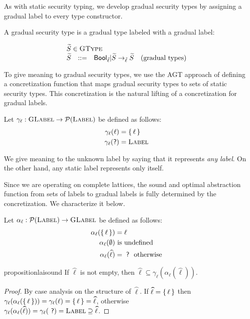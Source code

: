\documentclass[authoryear,sort&compress,9pt,twocolumn,nocopyrightspace]{sigplanconf}
\newcommand{\Bool}{\mathsf{Bool}}
\newcommand{\oblset}[1]{\textsc{#1}}
\newcommand{\Label}{\oblset{Label}}
\newcommand{\GType}{\oblset{GType}}
\newcommand{\GLabel}{\oblset{GLabel}}
\newcommand{\?}{\textsf{\upshape ?}} \newcommand{\consistent}[1]{\widetilde{#1}}
\newcommand{\collecting}[1]{\wideparen{#1}}
\newcommand{\lx}{\ell} \newcommand{\ul}{\?}\newcommand{\clx}{{\tilde{\lx}}} \newcommand{\cll}{\collecting{\lx}} \newcommand{\cS}{{\consistent{S}}} \newcommand{\clS}{\collecting{S}}\newcommand{\subl}{\preccurlyeq}\newcommand{\csubl}{\;\consistent{\subl}\;}
\newcommand{\gammal}{\gamma_\lx}
\newcommand{\alphal}{\alpha_\lx}
\begin{document}
As with static security typing, we develop gradual security types by assigning
a gradual label to every type constructor.

\begin{definition}
A gradual security type is a gradual type labeled with a gradual label:
\end{definition}
\begin{displaymath}
\begin{array}{rcll}
\multicolumn{4}{l}{\cS \in \GType}\\
\cS & ::= & \Bool_{\clx} | \cS ->_{\clx} \cS & \text{(gradual types)}\\
\end{array}
\end{displaymath}


To give meaning to gradual security types, we use the AGT approach of defining
a concretization function that maps gradual security types to sets of static
security types.  This concretization is the natural lifting of a concretization
for gradual labels.


\begin{definition}
Let ${\gammal : \GLabel -> \Pow(\Label)}$ be defined as follows:
\begin{align*}
  \gammal(\lx) &= \set{\lx} \\
  \gammal(\ul) &= \Label
\end{align*}
\end{definition}


\noindent We give meaning to the unknown label by saying that it represents 
\emph{any label}.  On the other hand, any static label represents only itself.

Since we are operating on complete lattices, the sound and optimal abstraction
function from sets of labels to gradual labels is fully determined by the
concretization.  We characterize it below.

\begin{definition}
  Let 
  $\alphal : \Pow(\Label) -> \GLabel$
  be defined as follows:
  \begin{align*}
    \alphal(\set{\lx})  &= \lx \\
    \alphal(\emptyset)  &\text{ is undefined} \\
    \alphal(\cll)  &= \;\ul \text{  otherwise}
  \end{align*}
\end{definition}

\begin{restatable}[$\alphal$ is Sound]{proposition}{laisound}
  \label{prop:lai-sound}
  If $\cll$ is not empty, then 
  ${\cll \subseteq \gammal(\alphal(\cll))}$.
\end{restatable}
\begin{proof}
By case analysis on the structure of $\cll$.  
If $\cll = \set{\lx}$ then $\gammal(\alphal(\set{\lx})) =
\gammal(\lx) = \set{\lx} = \cll$,
otherwise \\
${\gammal(\alphal(\cll)) = \gammal(\ul) = \Label \supseteq \cll}$.
\end{proof}
\end{document}
